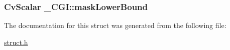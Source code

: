 \subsubsection[{\texorpdfstring{mask\+Lower\+Bound}{maskLowerBound}}]{\setlength{\rightskip}{0pt plus 5cm}Cv\+Scalar \+\_\+\+C\+G\+I\+::mask\+Lower\+Bound}\hypertarget{struct___c_g_i_a60c70aa60004326fe459e59d4e3aff5f}{}\label{struct___c_g_i_a60c70aa60004326fe459e59d4e3aff5f}


The documentation for this struct was generated from the following file\+:\begin{DoxyCompactItemize}
\item 
\hyperlink{struct_8h}{struct.\+h}\end{DoxyCompactItemize}
